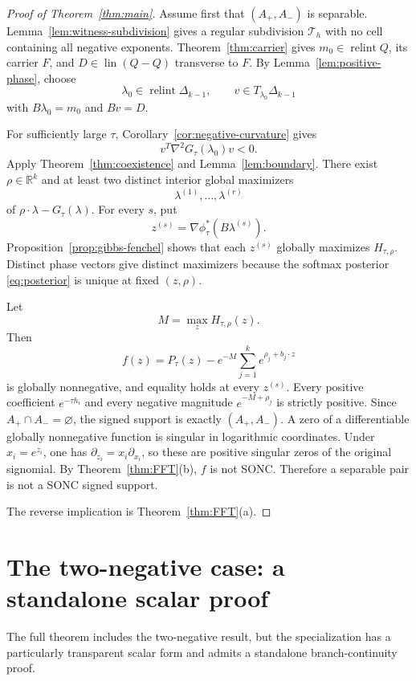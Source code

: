\documentclass[11pt]{article}
\theoremstyle{plain}
\theoremstyle{definition}
\theoremstyle{remark}
\newcommand{\R}{\mathbb R}
\newcommand{\relint}{\operatorname{relint}}
\newcommand{\lin}{\operatorname{lin}}
\newcommand{\DeltaK}{\Delta_{k-1}}
\begin{document}
\begin{proof}[Proof of Theorem~\ref{thm:main}]
Assume first that $(A_+,A_-)$ is separable. Lemma~\ref{lem:witness-subdivision} gives a regular subdivision $\mathcal T_h$ with no cell containing all negative exponents. Theorem~\ref{thm:carrier} gives $m_0\in\relint Q$, its carrier $F$, and $D\in\lin(Q-Q)$ transverse to $F$. By Lemma~\ref{lem:positive-phase}, choose
\[
 \lambda_0\in\relint\DeltaK,
 \qquad
 v\in T_{\lambda_0}\DeltaK
\]
with $B\lambda_0=m_0$ and $Bv=D$.

For sufficiently large $\tau$, Corollary~\ref{cor:negative-curvature} gives
\[
 v^T\nabla^2G_\tau(\lambda_0)v<0.
\]
Apply Theorem~\ref{thm:coexistence} and Lemma~\ref{lem:boundary}. There exist $\rho\in\R^k$ and at least two distinct interior global maximizers
\[
 \lambda^{(1)},\ldots,\lambda^{(r)}
\]
of $\rho\cdot\lambda-G_\tau(\lambda)$. For every $s$, put
\[
 z^{(s)}=\nabla\phi_\tau^*(B\lambda^{(s)}).
\]
Proposition~\ref{prop:gibbs-fenchel} shows that each $z^{(s)}$ globally maximizes $H_{\tau,\rho}$. Distinct phase vectors give distinct maximizers because the softmax posterior \eqref{eq:posterior} is unique at fixed $(z,\rho)$.

Let
\[
 M=\max_zH_{\tau,\rho}(z).
\]
Then
\begin{equation}\label{eq:witness}
 f(z)=P_\tau(z)-e^{-M}\sum_{j=1}^ke^{\rho_j+b_j\cdot z}
\end{equation}
is globally nonnegative, and equality holds at every $z^{(s)}$. Every positive coefficient $e^{-\tau h_i}$ and every negative magnitude $e^{-M+\rho_j}$ is strictly positive. Since $A_+\cap A_-=\varnothing$, the signed support is exactly $(A_+,A_-)$. A zero of a differentiable globally nonnegative function is singular in logarithmic coordinates. Under $x_i=e^{z_i}$, one has $\partial_{z_i}=x_i\partial_{x_i}$, so these are positive singular zeros of the original signomial. By Theorem~\ref{thm:FFT}\textup{(b)}, $f$ is not SONC. Therefore a separable pair is not a SONC signed support.

The reverse implication is Theorem~\ref{thm:FFT}\textup{(a)}.
\end{proof}

\section{The two-negative case: a standalone scalar proof}\label{sec:two-phase}

The full theorem includes the two-negative result, but the specialization has a particularly transparent scalar form and admits a standalone branch-continuity proof.
\end{document}
